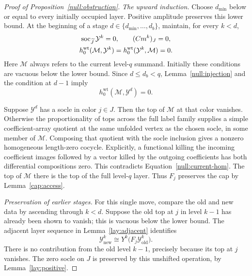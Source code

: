 \begin{proof}[Proof of Proposition~\ref{null:obstruction}]
\emph{The upward induction.}
Choose $d_{\min}$ below or equal to every initially occupied layer.
Positive amplitude preserves this lower bound.  At the beginning of
a stage $d\in\{d_{\min},\ldots,d_b\}$, maintain, for every $k<d$,
\begin{equation}
 \begin{gathered}
 \operatorname{soc}_{\widetilde J}\mathcal Y^k=0,\qquad (Cm^k)_J=0,\\
 h_0^{\mathrm{wt}}(\mathcal M,\mathcal Y^k)
   =h_0^{\mathrm{wt}}(\mathcal Y^k,\mathcal M)=0.
 \end{gathered}
 \label{null:induction}
\end{equation}
Here $\mathcal M$ always refers to the current level-$q$ summand.
Initially these conditions are vacuous below the lower bound.
Since $d\le d_b<q$, Lemma~\ref{null:injection} and the condition at
$d-1$ imply
\begin{equation}
 h_0^{\mathrm{wt}}(\mathcal M,\mathcal Y^d)=0.
 \label{null:current-hom}
\end{equation}

Suppose $\mathcal Y^d$ has a socle in color $j\in J$.  Then the top
of $\mathcal M$ at that color vanishes.  Otherwise the proportionality
of tops across the full label family supplies a simple coefficient-array
quotient at the same unfolded vertex as the chosen socle, in some member
of $\mathcal M$.  Composing that quotient with the socle inclusion
gives a nonzero homogeneous length-zero cocycle.  Explicitly, a functional
killing the incoming coefficient images followed by a vector killed by
the outgoing coefficients has both differential compositions zero.
This contradicts
Equation~\eqref{null:current-hom}.  The top of $\mathcal M$ there is
the top of the full level-$q$ layer.  Thus $F_j$ preserves the cap by
Lemma~\ref{cap:access}.

\emph{Preservation of earlier stages.}
For this single move, compare the old and new data by ascending through
$k<d$.  Suppose the old top at $j$ in level $k-1$ has already been
shown to vanish; this is vacuous below the lower bound.  The adjacent
layer sequence in Lemma~\ref{lay:adjacent} identifies
\begin{equation}
 \mathcal Y^k_{\mathrm{new}}
    \cong Y^k\bigl(F_j\mathcal Y^k_{\mathrm{old}}\bigr).
 \label{null:unshifted}
\end{equation}
There is no contribution from the old level $k-1$, precisely because
its top at $j$ vanishes.  The zero socle on $J$ is preserved by this
unshifted operation, by Lemma~\ref{lay:positive}.


\end{proof}
